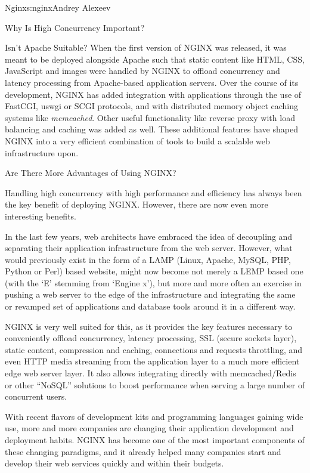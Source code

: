 \begin{aosachapter}{Nginx}{s:nginx}{Andrey Alexeev}
\begin{aosasect1}{Why Is High Concurrency Important?}
\begin{aosasect2}{Isn't Apache Suitable?}
When the first version of NGINX was released, it was meant to be
deployed alongside Apache such that static content like HTML, CSS,
JavaScript and images were handled by NGINX to offload concurrency and
latency processing from Apache-based application servers. Over the
course of its development, NGINX has added integration with
applications through the use of FastCGI, uswgi or SCGI protocols, and
with distributed memory object caching systems like
\emph{memcached}. Other useful functionality like reverse proxy with
load balancing and caching was added as well. These additional
features have shaped NGINX into a very efficient combination of tools
to build a scalable web infrastructure upon.

\end{aosasect2}

\begin{aosasect2}{Are There More Advantages of Using NGINX?}

Handling high concurrency with high performance and efficiency has
always been the key benefit of deploying NGINX. However, there
are now even more interesting benefits.

In the last few years, web architects have embraced the idea of
decoupling and separating their application infrastructure from the
web server. However, what would previously exist in the form of a LAMP
(Linux, Apache, MySQL, PHP, Python or Perl) based website, might now
become not merely a LEMP based one (with the `E' stemming from `Engine
x'), but more and more often an exercise in pushing a web server to
the edge of the infrastructure and integrating the same or revamped
set of applications and database tools around it in a different way.

NGINX is very well suited for this, as it provides the key features
necessary to conveniently offload concurrency, latency processing, SSL
(secure sockets layer), static content, compression and caching,
connections and requests throttling, and even HTTP media streaming
from the application layer to a much more efficient edge web server
layer. It also allows integrating directly with memcached/Redis or
other ``NoSQL'' solutions to boost performance when serving a large
number of concurrent users.

With recent flavors of development kits and programming languages
gaining wide use, more and more companies are changing their
application development and deployment habits. NGINX has become one of
the most important components of these changing paradigms, and it
already helped many companies start and develop their web services
quickly and within their budgets.


\end{aosasect2}
\end{aosasect1}
\end{aosachapter}
